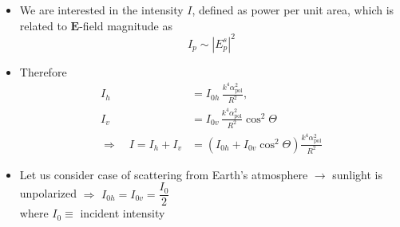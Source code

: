 \documentclass[11pt, oneside]{article}
\begin{document}
\begin{itemize}
\begin{itemize}
\begin{align}
			E^s_h &= -E^i_h\,\frac{k^2\alpha_\mathrm{pol}}{R}\,e^{j(\omega t - kR)}\sin\theta_1, \label{e:Eh}\\
			E^s_v &= -E^i_v\,\frac{k^2\alpha_\mathrm{pol}}{R}\,e^{j(\omega t - kR)}\sin\theta_2, \label{e:Ev}
		\end{align}
		where $\theta_1 = \dfrac{\pi}{2}$ by definition (see lecture notes on geometric optics)\\
		and $\theta_2 = \dfrac{\pi}{2} - \Theta$ where $\Theta \equiv$ scattering angle (angle between incident \& scattered waves)
		\item[--] We are interested in the intensity $I$, defined as power per unit area, which is related to $\mathbf{E}$-field magnitude as
		\begin{equation}
			\label{e:IE}
			I_p \sim |E^s_p|^2
		\end{equation}
		\item[--] Therefore
		\begin{align}
			I_h &= I_{0h}\,\frac{k^4\alpha_\mathrm{pol}^2}{R^2}, \label{e:Ih}\\
			I_v &= I_{0v}\,\frac{k^4\alpha_\mathrm{pol}^2}{R^2}\cos^2\Theta \label{e:Iv}\\
			\Rightarrow\quad I = I_h + I_v &= \left(I_{0h} + I_{0v}\cos^2\Theta\right)\frac{k^4\alpha_\mathrm{pol}^2}{R^2} \nonumber
		\end{align}
		\item[--] Let us consider case of scattering from Earth's atmosphere $\rightarrow$ sunlight is unpolarized $\Rightarrow$ $I_{0h} = I_{0v} = \dfrac{I_0}{2}$\\
		where $I_0 \equiv$ incident intensity
		\begin{equation}
			\label{e:Ray}

\end{equation}
\end{itemize}
\end{itemize}
\end{document}
